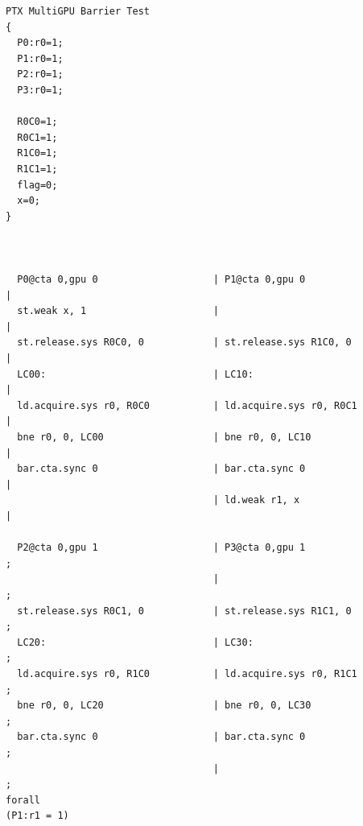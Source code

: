 \documentclass[acmsmall]{acmart}
\begin{document}
\lstset{language=ptx}
\begin{lstlisting}[caption={A sample litmus test with simplified instructions matching listing \ref{lst:barrier-ptx}. Note that predicate registers are not supported, so control flow is facilitated using \texttt{bne}.}, label={lst:litmus-simple}]
PTX MultiGPU Barrier Test
{
  P0:r0=1;
  P1:r0=1;
  P2:r0=1;
  P3:r0=1;
  
  R0C0=1;
  R0C1=1;
  R1C0=1;
  R1C1=1;
  flag=0;
  x=0;
}



  P0@cta 0,gpu 0                    | P1@cta 0,gpu 0                    | 
  st.weak x, 1                      |                                   | 
  st.release.sys R0C0, 0            | st.release.sys R1C0, 0            | 
  LC00:                             | LC10:                             | 
  ld.acquire.sys r0, R0C0           | ld.acquire.sys r0, R0C1           | 
  bne r0, 0, LC00                   | bne r0, 0, LC10                   | 
  bar.cta.sync 0                    | bar.cta.sync 0                    | 
                                    | ld.weak r1, x                     | 

  P2@cta 0,gpu 1                    | P3@cta 0,gpu 1                     ;
                                    |               	       	         ;
  st.release.sys R0C1, 0            | st.release.sys R1C1, 0             ;
  LC20:                             | LC30:                              ;   
  ld.acquire.sys r0, R1C0           | ld.acquire.sys r0, R1C1            ;
  bne r0, 0, LC20                   | bne r0, 0, LC30                    ;
  bar.cta.sync 0                    | bar.cta.sync 0                     ;
                                    |										                 ;
forall
(P1:r1 = 1)

\end{lstlisting}


\end{document}
